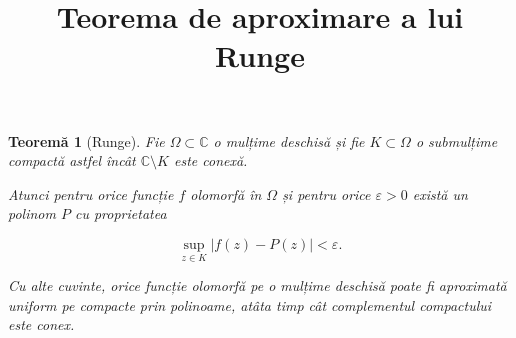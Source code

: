 \documentclass[12pt]{article}
\title{\Large\textbf{Teorema de aproximare a lui Runge}}
\date{}
\theoremstyle{plain}
\newtheorem{theorem}{Teoremă}
\begin{document}
\maketitle

\begin{theorem}[Runge]
Fie $\Omega \subset \mathbb{C}$ o mulțime deschisă și fie $K \subset \Omega$ o submulțime compactă
astfel încât $\mathbb{C} \setminus K$ este conexă.

Atunci pentru orice funcție $f$ olomorfă în $\Omega$ și pentru orice $\varepsilon > 0$ există un polinom $P$
cu proprietatea


\[
\sup_{z \in K} |f(z) - P(z)| < \varepsilon.
\]



Cu alte cuvinte, orice funcție olomorfă pe o mulțime deschisă poate fi aproximată uniform pe compacte
prin polinoame, atâta timp cât complementul compactului este conex.
\end{theorem}
\end{document}
